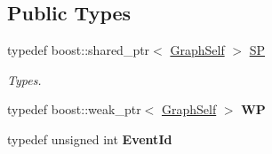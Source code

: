 \subsection*{Public Types}
\begin{DoxyCompactItemize}
\item 
\mbox{\label{class_graph_self_a1056eed01bb12bab3637ccccd7ae6932}} 
typedef boost\+::shared\+\_\+ptr$<$ \hyperlink{class_graph_self}{Graph\+Self} $>$ \hyperlink{class_graph_self_a1056eed01bb12bab3637ccccd7ae6932}{SP}
\begin{DoxyCompactList}\small\item\em Types. \end{DoxyCompactList}\item 
\mbox{\label{class_graph_self_afc131300883779c56973328bf52b1f25}} 
typedef boost\+::weak\+\_\+ptr$<$ \hyperlink{class_graph_self}{Graph\+Self} $>$ {\bfseries WP}
\item 
\mbox{\label{class_graph_self_abf1007417c7f7f1f26460db99c8cd79f}} 
typedef unsigned int {\bfseries Event\+Id}
\end{DoxyCompactItemize}
